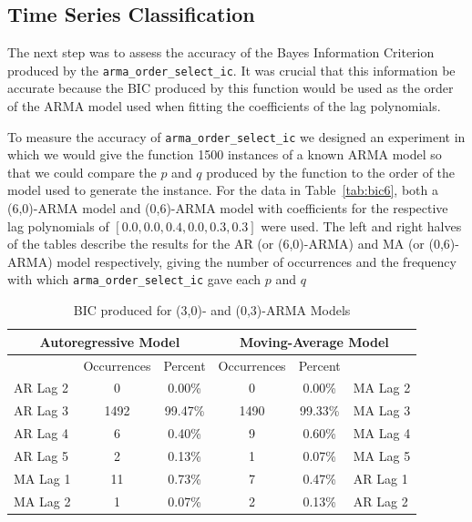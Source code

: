\documentclass[oneside,12pt,openany]{book}
\begin{document}
    \subsection{Time Series Classification}
    
      The next step was to assess the accuracy of the Bayes Information Criterion produced by the \texttt{arma\_order\_select\_ic}. It was crucial that this information be accurate because the BIC produced by this function would be used as the order of the ARMA model used when fitting the coefficients of the lag polynomials. 
      
      To measure the accuracy of \texttt{arma\_order\_select\_ic} we designed an experiment in which we would give the function 1500 instances of a known ARMA model so that we could compare the $p$ and $q$ produced by the function to the order of the model used to generate the instance. For the data in Table~\ref{tab:bic6}, both a (6,0)-ARMA model and (0,6)-ARMA model with coefficients for the respective lag polynomials of $[0.0,0.0,0.4,0.0,0.3,0.3]$ were used. The left and right halves of the tables describe the results for the AR (or (6,0)-ARMA) and MA (or (0,6)-ARMA) model respectively, giving the number of occurrences and the frequency with which \texttt{arma\_order\_select\_ic} gave each $p$ and $q$
      
      \begin{table}[]
          \centering
          \begin{tabular}{|l|c|c|c|c|l|}
              \hline
              \multicolumn{3}{|c|}{Autoregressive Model} & \multicolumn{3}{c|}{Moving-Average Model} \\ \hline
              \cellcolor{black} & Occurrences & Percent & Occurrences & Percent & \cellcolor{black} \\ \hline
              AR Lag 2 & 0 & 0.00\% & 0 & 0.00\% & MA Lag 2 \\ \hline
              AR Lag 3 & 1492 & 99.47\% & 1490 & 99.33\% & MA Lag 3 \\ \hline
              AR Lag 4 & 6 & 0.40\% & 9 & 0.60\% & MA Lag 4 \\ \hline
              AR Lag 5 & 2 & 0.13\% & 1 & 0.07\% & MA Lag 5 \\ \hline
              MA Lag 1 & 11 & 0.73\% & 7 & 0.47\% & AR Lag 1 \\ \hline
              MA Lag 2 & 1 & 0.07\% & 2 & 0.13\% & AR Lag 2 \\ \hline
          \end{tabular}
           \caption{BIC produced for (3,0)- and (0,3)-ARMA Models}
          \label{tab:bic3}
      \end{table}
      
\end{document}
